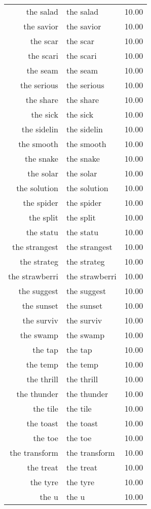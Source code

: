 \begin{table}[ht]
\begin{tabular}{rlr}
  the salad & the salad & 10.00 \\ 
  the savior & the savior & 10.00 \\ 
  the scar & the scar & 10.00 \\ 
  the scari & the scari & 10.00 \\ 
  the seam & the seam & 10.00 \\ 
  the serious & the serious & 10.00 \\ 
  the share & the share & 10.00 \\ 
  the sick & the sick & 10.00 \\ 
  the sidelin & the sidelin & 10.00 \\ 
  the smooth & the smooth & 10.00 \\ 
  the snake & the snake & 10.00 \\ 
  the solar & the solar & 10.00 \\ 
  the solution & the solution & 10.00 \\ 
  the spider & the spider & 10.00 \\ 
  the split & the split & 10.00 \\ 
  the statu & the statu & 10.00 \\ 
  the strangest & the strangest & 10.00 \\ 
  the strateg & the strateg & 10.00 \\ 
  the strawberri & the strawberri & 10.00 \\ 
  the suggest & the suggest & 10.00 \\ 
  the sunset & the sunset & 10.00 \\ 
  the surviv & the surviv & 10.00 \\ 
  the swamp & the swamp & 10.00 \\ 
  the tap & the tap & 10.00 \\ 
  the temp & the temp & 10.00 \\ 
  the thrill & the thrill & 10.00 \\ 
  the thunder & the thunder & 10.00 \\ 
  the tile & the tile & 10.00 \\ 
  the toast & the toast & 10.00 \\ 
  the toe & the toe & 10.00 \\ 
  the transform & the transform & 10.00 \\ 
  the treat & the treat & 10.00 \\ 
  the tyre & the tyre & 10.00 \\ 
  the u & the u & 10.00 \\ 

\end{tabular}
\end{table}
